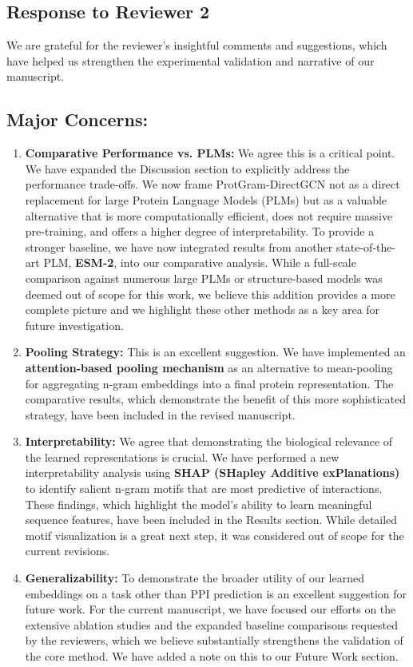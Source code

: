 \documentclass[11pt, a4paper]{article}
\begin{document}
	\subsection*{Response to Reviewer 2}
	
	We are grateful for the reviewer's insightful comments and suggestions, which have helped us strengthen the experimental validation and narrative of our manuscript.
	
	\subsection*{Major Concerns:}
	\begin{enumerate}[label=\arabic*., leftmargin=*]
		\item \textbf{Comparative Performance vs. PLMs:} We agree this is a critical point. We have expanded the Discussion section to explicitly address the performance trade-offs. We now frame ProtGram-DirectGCN not as a direct replacement for large Protein Language Models (PLMs) but as a valuable alternative that is more computationally efficient, does not require massive pre-training, and offers a higher degree of interpretability. To provide a stronger baseline, we have now integrated results from another state-of-the-art PLM, \textbf{ESM-2}, into our comparative analysis. While a full-scale comparison against numerous large PLMs or structure-based models was deemed out of scope for this work, we believe this addition provides a more complete picture and we highlight these other methods as a key area for future investigation.
		
		\item \textbf{Pooling Strategy:} This is an excellent suggestion. We have implemented an \textbf{attention-based pooling mechanism} as an alternative to mean-pooling for aggregating n-gram embeddings into a final protein representation. The comparative results, which demonstrate the benefit of this more sophisticated strategy, have been included in the revised manuscript.
		
		\item \textbf{Interpretability:} We agree that demonstrating the biological relevance of the learned representations is crucial. We have performed a new interpretability analysis using \textbf{SHAP (SHapley Additive exPlanations)} to identify salient n-gram motifs that are most predictive of interactions. These findings, which highlight the model's ability to learn meaningful sequence features, have been included in the Results section. While detailed motif visualization is a great next step, it was considered out of scope for the current revisions.
		
		\item \textbf{Generalizability:} To demonstrate the broader utility of our learned embeddings on a task other than PPI prediction is an excellent suggestion for future work. For the current manuscript, we have focused our efforts on the extensive ablation studies and the expanded baseline comparisons requested by the reviewers, which we believe substantially strengthens the validation of the core method. We have added a note on this to our Future Work section.
		
	\end{enumerate}
	
\end{document}

